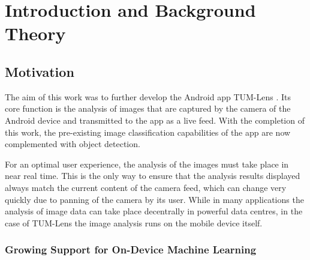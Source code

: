 \documentclass[
			   fontsize=11pt,
               paper=a4,
               bibliography=totoc,
               idxtotoc,
               headsepline,
               footsepline,
               footinclude=false,
               BCOR=12mm,
               DIV=13,
               openany,   %
               ]
               {scrbook}
\begin{document}
\mainmatter

\part{Introduction and Background Theory}

\chapter{Motivation} \label{chap:motivation}

The aim of this work was to further develop the Android app TUM-Lens \cite{lensApp}. Its core function is the analysis of images that are captured by the camera of the Android device and transmitted to the app as a live feed. With the completion of this work, the pre-existing image classification capabilities of the app are now complemented with object detection.

For an optimal user experience, the analysis of the images must take place in near real time. This is the only way to ensure that the analysis results displayed always match the current content of the camera feed, which can change very quickly due to panning of the camera by its user. While in many applications the analysis of image data can take place decentrally in powerful data centres, in the case of TUM-Lens the image analysis runs on the mobile device itself.


\section{Growing Support for On-Device Machine Learning}
\end{document}
